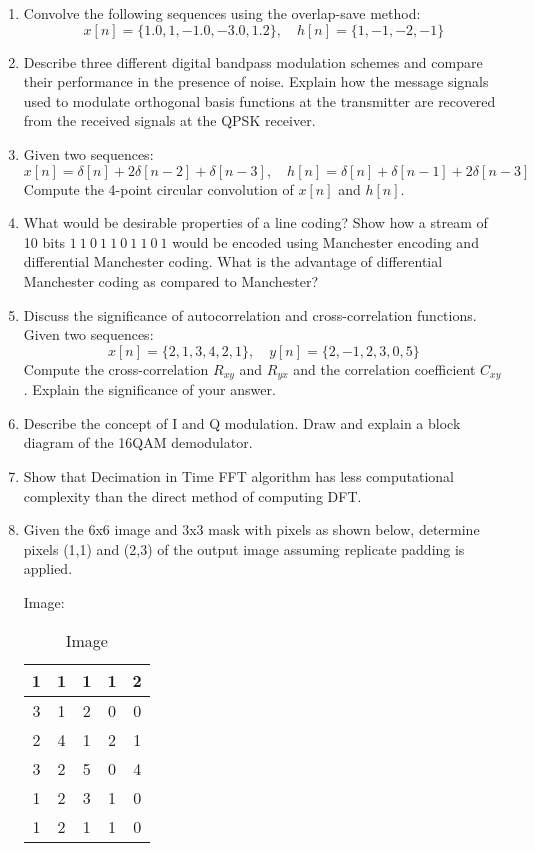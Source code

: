 \begin{enumerate}
    \item Convolve the following sequences using the overlap-save method:
    \[
    x[n] = \{1.0, 1, -1.0, -3.0, 1.2\}, \quad h[n] = \{1, -1, -2, -1\}
    \]

    \item Describe three different digital bandpass modulation schemes and compare their performance in the presence of noise.
    Explain how the message signals used to modulate orthogonal basis functions at the transmitter are recovered from the received signals at the QPSK receiver.

    \item Given two sequences:
    \[
    x[n] = \delta[n] + 2\delta[n-2] + \delta[n-3], \quad h[n] = \delta[n] + \delta[n-1] + 2\delta[n-3]
    \]
    Compute the 4-point circular convolution of \(x[n]\) and \(h[n]\).

    \item What would be desirable properties of a line coding?
    Show how a stream of 10 bits \(1\ 1\ 0\ 1\ 1\ 0\ 1\ 1\ 0\ 1\) would be encoded using Manchester encoding and differential Manchester coding. What is the advantage of differential Manchester coding as compared to Manchester?

    \item Discuss the significance of autocorrelation and cross-correlation functions.  
    Given two sequences:  
    \[
    x[n] = \{2, 1, 3, 4, 2, 1\}, \quad y[n] = \{2, -1, 2, 3, 0, 5\}
    \]
    Compute the cross-correlation \(R_{xy}\) and \(R_{yx}\) and the correlation coefficient \(C_{xy}\).  
    Explain the significance of your answer.

    \item Describe the concept of I and Q modulation.  
    Draw and explain a block diagram of the 16QAM demodulator.

    \item Show that Decimation in Time FFT algorithm has less computational complexity than the direct method of computing DFT.

    \item Given the 6x6 image and 3x3 mask with pixels as shown below, determine pixels (1,1) and (2,3) of the output image assuming replicate padding is applied.

    Image:
    \begin{table}[h!]
\centering
\begin{tabular}{|c|c|c|c|c|}
\hline
1 & 1 & 1 & 1 & 2 \\
\hline
3 & 1 & 2 & 0 & 0 \\
\hline
2 & 4 & 1 & 2 & 1 \\
\hline
3 & 2 & 5 & 0 & 4 \\
\hline
1 & 2 & 3 & 1 & 0 \\
\hline
1 & 2 & 1 & 1 & 0 \\
\hline
\end{tabular}
\caption{Image}
\end{table}


\end{enumerate}
